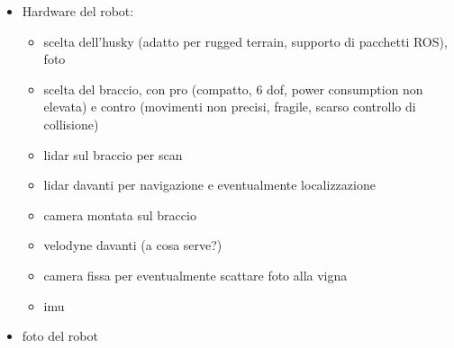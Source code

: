 \begin{itemize}
\item Hardware del robot:
		\begin{itemize}
			\item scelta dell'husky (adatto per rugged terrain, supporto di pacchetti ROS), foto
			\item scelta del braccio, con pro (compatto, 6 dof, power consumption non elevata) e contro (movimenti non precisi, fragile, scarso controllo di collisione)
			\item lidar sul braccio per scan
			\item lidar davanti per navigazione e eventualmente localizzazione
			\item camera montata sul braccio
			\item velodyne davanti (a cosa serve?)
			\item camera fissa per eventualmente scattare foto alla vigna
			\item imu
		\end{itemize}
	\item foto del robot 
\end{itemize}

